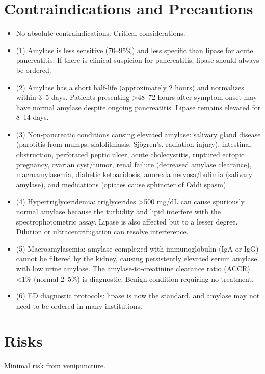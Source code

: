 \section*{Contraindications and Precautions}
\begin{itemize}
  \item No absolute contraindications. Critical considerations:
  \item (1) Amylase is less sensitive (70--95\%) and less specific than lipase for acute pancreatitis. If there is clinical suspicion for pancreatitis, lipase should always be ordered.
  \item (2) Amylase has a short half-life (approximately 2 hours) and normalizes within 3--5 days. Patients presenting >48--72 hours after symptom onset may have normal amylase despite ongoing pancreatitis. Lipase remains elevated for 8--14 days.
  \item (3) Non-pancreatic conditions causing elevated amylase: salivary gland disease (parotitis from mumps, sialolithiasis, Sj\"{o}gren's, radiation injury), intestinal obstruction, perforated peptic ulcer, acute cholecystitis, ruptured ectopic pregnancy, ovarian cyst/tumor, renal failure (decreased amylase clearance), macroamylasemia, diabetic ketoacidosis, anorexia nervosa/bulimia (salivary amylase), and medications (opiates cause sphincter of Oddi spasm).
  \item (4) Hypertriglyceridemia: triglycerides >500 mg/dL can cause spuriously normal amylase because the turbidity and lipid interfere with the spectrophotometric assay. Lipase is also affected but to a lesser degree. Dilution or ultracentrifugation can resolve interference.
  \item (5) Macroamylasemia: amylase complexed with immunoglobulin (IgA or IgG) cannot be filtered by the kidney, causing persistently elevated serum amylase with low urine amylase. The amylase-to-creatinine clearance ratio (ACCR) <1\% (normal 2--5\%) is diagnostic. Benign condition requiring no treatment.
  \item (6) ED diagnostic protocols: lipase is now the standard, and amylase may not need to be ordered in many institutions.
\end{itemize}
\section*{Risks}
Minimal risk from venipuncture.

